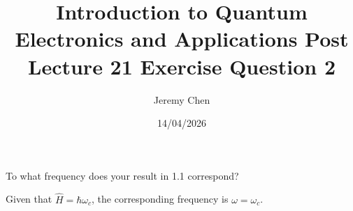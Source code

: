 \documentclass[10pt,letterpaper]{article}
\title{Introduction to Quantum Electronics and Applications Post Lecture 21 Exercise Question 2}
\author{Jeremy Chen}
\date{14/04/2026}
\begin{document}
	\maketitle
	
\noindent To what frequency does your result in 1.1 correspond?

\color{violet}
Given that $\hat{H} = \hbar\omega_{c}$, the corresponding frequency is $\omega = \omega_{c}$. 
\color{black}
\end{document}

